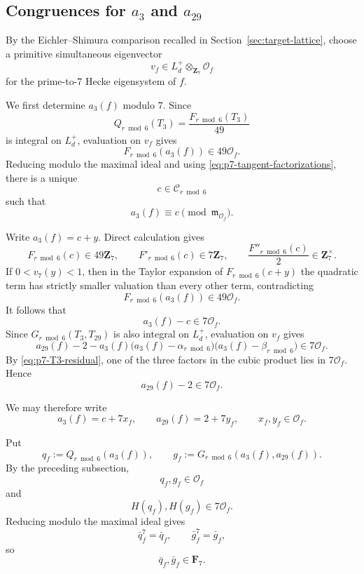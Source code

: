 \documentclass[11pt]{article}
\theoremstyle{plain}
\theoremstyle{definition}
\theoremstyle{remark}
\numberwithin{equation}{section}
\begin{document}
\subsection{Congruences for \texorpdfstring{\(a_3\)}{a3} and
\texorpdfstring{\(a_{29}\)}{a29}}

By the Eichler--Shimura comparison recalled in Section~\ref{sec:target-lattice}, choose a primitive simultaneous eigenvector \[v_f\in L_d^+\otimes_{\mathbf Z_7}\mathcal O_f\] for the prime-to-\(7\) Hecke eigensystem of \(f\).

We first determine \(a_3(f)\) modulo \(7\).  Since \[Q_{r\bmod6}(T_3)=\frac{F_{r\bmod6}(T_3)}{49}\] is integral on \(L_d^+\), evaluation on \(v_f\) gives \[ F_{r\bmod6}(a_3(f))\in49\mathcal O_f. \] Reducing modulo the maximal ideal and using \eqref{eq:p7-tangent-factorizations}, there is a unique \[ c\in\mathcal C_{r\bmod6} \] such that \[ a_3(f)\equiv c\pmod{\mathfrak m_{\mathcal O_f}}. \]

Write \(a_3(f)=c+y\). Direct calculation gives \[F_{r\bmod6}(c)\in49\mathbf Z_7,\qquad F'_{r\bmod6}(c)\in7\mathbf Z_7, \qquad \frac{F''_{r\bmod6}(c)}2\in\mathbf Z_7^\times. \] If \(0<v_7(y)<1\), then in the Taylor expansion of \(F_{r\bmod6}(c+y)\) the quadratic term has strictly smaller valuation than every other term, contradicting \[ F_{r\bmod6}(a_3(f))\in49\mathcal O_f. \] It follows that \begin{equation} a_3(f)-c\in7\mathcal O_f. \label{eq:p7-T3-residual} \end{equation} Since \(G_{r\bmod6}(T_3,T_{29})\) is also integral on \(L_d^+\), evaluation on \(v_f\) gives \[ a_{29}(f)-2 - a_3(f) \bigl(a_3(f)-\alpha_{r\bmod6}\bigr) \bigl(a_3(f)-\beta_{r\bmod6}\bigr) \in7\mathcal O_f. \] By \eqref{eq:p7-T3-residual}, one of the three factors in the cubic product lies in \(7\mathcal O_f\).  Hence \begin{equation} a_{29}(f)-2\in7\mathcal O_f. \label{eq:p7-T29-residual} \end{equation} 

We may therefore write \begin{equation} a_3(f)=c+7x_f, \qquad a_{29}(f)=2+7y_f, \qquad x_f, y_f\in\mathcal O_f. \label{eq:p7-raw-digits} \end{equation}

Put \[q_f:=Q_{r\bmod6}(a_3(f)), \qquad g_f:=G_{r\bmod6}(a_3(f),a_{29}(f)). \] By the preceding subsection, \[ q_f,g_f\in\mathcal O_f \] and \[ H(q_f),H(g_f)\in7\mathcal O_f. \] Reducing modulo the maximal ideal gives \[ \bar q_f^7=\bar q_f, \qquad \bar g_f^7=\bar g_f, \] so \[ \bar q_f,\bar g_f\in\mathbf F_7. \] 
\end{document}
